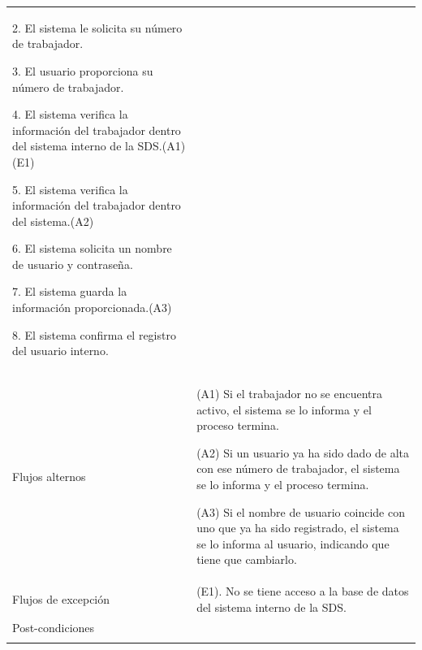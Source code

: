 \begin{longtable}{@{\extracolsep{8pt}}l p{8.5cm}}
 2. El sistema le solicita su número de trabajador. \par\vspace{.1cm}

 3. El usuario proporciona su número de trabajador. \par\vspace{.1cm}

 4. El sistema verifica la información del trabajador dentro del sistema interno de la SDS.(A1)(E1) \par\vspace{.1cm}

 5. El sistema verifica la información del trabajador dentro del sistema.(A2) \par\vspace{.1cm}

 6. El sistema solicita un nombre de usuario y contraseña. \par\vspace{.1cm}

 7. El sistema guarda la información proporcionada.(A3) \par\vspace{.1cm}

 8. El sistema confirma el registro del usuario interno. \par\vspace{.1cm}

   \par\vspace{.1cm}

\\

\hspace{.2cm}Flujos alternos &
\par (A1) Si el trabajador no se encuentra activo, el sistema se lo informa y el proceso termina.

\par (A2) Si un usuario ya ha sido dado de alta con ese número de trabajador, el sistema se lo informa y el proceso termina.

\par (A3) Si el nombre de usuario coincide con uno que ya ha sido registrado, el sistema se lo informa al usuario, indicando que tiene que cambiarlo.



\\

\hspace{.2cm}Flujos de excepción &
\par\vspace{.1cm} (E1). No se tiene acceso a la base de datos del sistema interno de la SDS.


\\%

\hspace{.2cm}Post-condiciones &
\\
\hline

 \\
\end{longtable}
\endgroup


